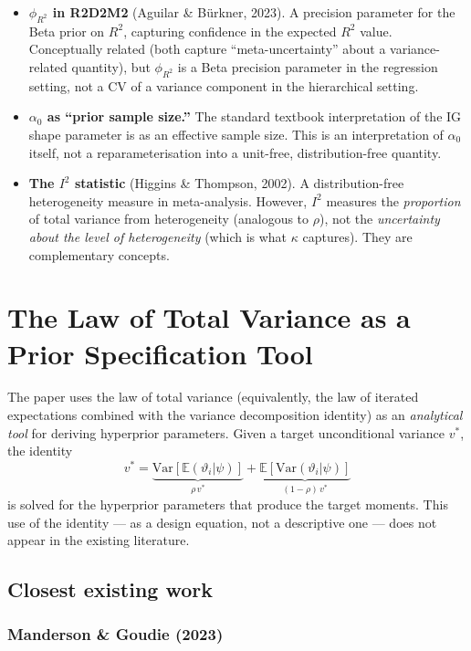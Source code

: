 \documentclass[12pt,a4paper]{article}
\newcommand{\E}{\mathbb{E}}
\newcommand{\Var}{\mathrm{Var}}
\begin{document}
\begin{itemize}
  \item \textbf{$\phi_{R^2}$ in R2D2M2} (Aguilar \& B\"{u}rkner, 2023). A
    precision parameter for the Beta prior on $R^2$, capturing confidence in the
    expected $R^2$ value. Conceptually related (both capture ``meta-uncertainty''
    about a variance-related quantity), but $\phi_{R^2}$ is a Beta precision
    parameter in the regression setting, not a CV of a variance component in the
    hierarchical setting.

  \item \textbf{$\alpha_0$ as ``prior sample size.''} The standard textbook
    interpretation of the IG shape parameter is as an effective sample size.
    This is an interpretation of $\alpha_0$ itself, not a reparameterisation
    into a unit-free, distribution-free quantity.

  \item \textbf{The $I^2$ statistic} (Higgins \& Thompson, 2002). A
    distribution-free heterogeneity measure in meta-analysis. However, $I^2$
    measures the \emph{proportion} of total variance from heterogeneity
    (analogous to $\rho$), not the \emph{uncertainty about the level of
    heterogeneity} (which is what $\kappa$ captures). They are complementary
    concepts.
\end{itemize}


\section{The Law of Total Variance as a Prior Specification Tool}

The paper uses the law of total variance (equivalently, the law of iterated
expectations combined with the variance decomposition identity) as an
\emph{analytical tool} for deriving hyperprior parameters. Given a target
unconditional variance $v^*$, the identity
\[
  v^* = \underbrace{\Var[\E(\vartheta_i|\psi)]}_{\rho\, v^*}
      + \underbrace{\E[\Var(\vartheta_i|\psi)]}_{(1-\rho)\, v^*}
\]
is solved for the hyperprior parameters that produce the target moments. This
use of the identity --- as a design equation, not a descriptive one --- does
not appear in the existing literature.

\subsection{Closest existing work}

\subsubsection{Manderson \& Goudie (2023)}
\end{document}
